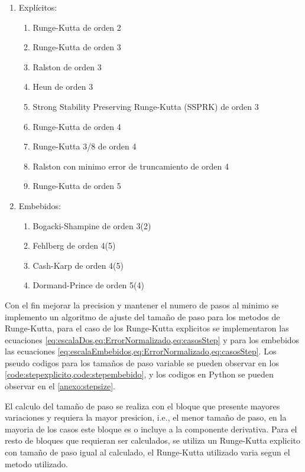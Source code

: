         \begin{enumerate}[leftmargin=\parindent]
            \item Explícitos:
                \begin{enumerate}
                    \item Runge-Kutta de orden 2
                    \item Runge-Kutta de orden 3
                    \item Ralston de orden 3
                    \item Heun de orden 3
                    \item Strong Stability Preserving Runge-Kutta (SSPRK) de orden 3
                    \item Runge-Kutta de orden 4
                    \item Runge-Kutta 3/8 de orden 4
                    \item Ralston con minimo error de truncamiento de orden 4
                    \item Runge-Kutta de orden 5
                \end{enumerate}
            \item Embebidos:
                \begin{enumerate}
                    \item Bogacki-Shampine de orden 3(2)
                    \item Fehlberg  de orden 4(5)
                    \item Cash-Karp de orden 4(5)
                    \item Dormand-Prince de orden 5(4)
                \end{enumerate}
        \end{enumerate}

        Con el fin mejorar la precision y mantener el numero de pasos al minimo se implemento un algoritmo de ajuste del tamaño de paso para los metodos de Runge-Kutta, para el caso de los Runge-Kutta explicitos se implementaron las ecuaciones \cref{eq:escalaDos,eq:ErrorNormalizado,eq:casosStep} y para los embebidos las ecuaciones \cref{eq:escalaEmbebidos,eq:ErrorNormalizado,eq:casosStep}. Los pseudo codigos para los tamaños de paso variable se pueden observar en los \cref{code:stepexplicito,code:stepembebido}, y los codigos en Python se pueden observar en el \ref{anexo:stepsize}.

        El calculo del tamaño de paso se realiza con el bloque que presente mayores variaciones y requiera la mayor presicion, i.e., el menor tamaño de paso, en la mayoria de los casos este bloque es o incluye a la componente derivativa. Para el resto de bloques que requieran ser calculados, se utiliza un Runge-Kutta explicito con tamaño de paso igual al calculado, el Runge-Kutta utilizado varia segun el metodo utilizado.

